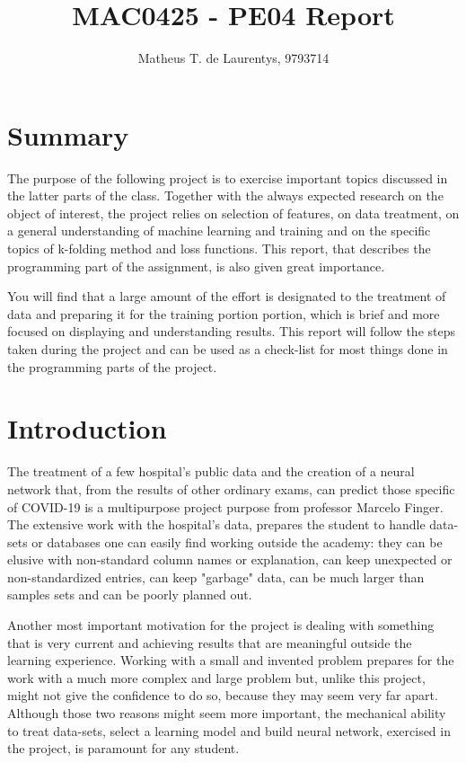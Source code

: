 \documentclass[]{article}
\title{\vspace{-4.0cm}MAC0425 - PE04 Report}
\author{Matheus T. de Laurentys, 9793714}
\begin{document}
	\maketitle
	\section{Summary}
	
	The purpose of the following project is to exercise important topics discussed in the latter parts of the class. Together with the always expected research on the object of interest, the project relies on selection of features, on data treatment, on a general understanding of machine learning and training and on the specific topics of k-folding method and loss functions. This report, that describes the programming part of the assignment, is also given great importance.
	
	You will find that a large amount of the effort is designated to the treatment of data and preparing it for the training portion portion, which is brief and more focused on displaying and understanding results. This report will follow the steps taken during the project and can be used as a check-list for most things done in the programming parts of the project.
	
	\section{Introduction}
	
	The treatment of a few hospital's public data and the creation of a neural network that, from the results of other ordinary exams, can predict those specific of COVID-19 is a multipurpose project purpose from professor Marcelo Finger. The extensive work with the hospital's data, prepares the student to handle data-sets or databases one can easily find working outside the academy: they can be elusive with non-standard column names or explanation, can keep unexpected or non-standardized entries, can keep "garbage" data, can be much larger than samples sets and can be poorly planned out.
	
	Another most important motivation for the project is dealing with something that is very current and achieving results that are meaningful outside the learning experience. Working with a small and invented problem prepares for the work with a much more complex and large problem but, unlike this project, might not give the confidence to do so, because they may seem very far apart. Although those two reasons might seem more important, the mechanical ability to treat data-sets, select a learning model and build neural network, exercised in the project, is paramount for any student.
	
\end{document}
